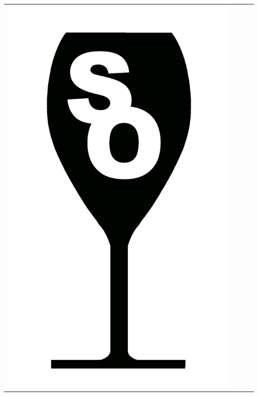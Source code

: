 {\renewcommand{\arraystretch}{1.1}
\begin{center}
\begin{tabular}{ c c c c}
\includegraphics[scale=0.021, trim= 0em -5em -5em -5em,]{Icones/icon_sudouest_black.pdf}
&

\end{tabular}
\end{center}}

